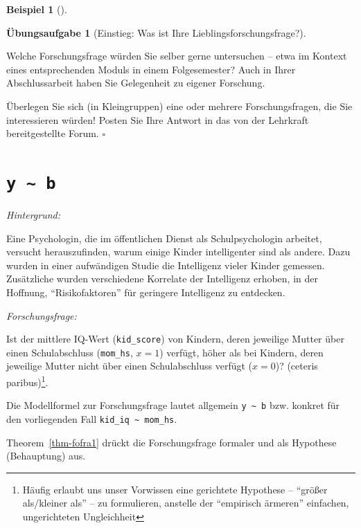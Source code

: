 \documentclass[
  ngerman,
  letterpaper,
  twoside,
  open=any]{scrbook}
\theoremstyle{definition}
\newtheorem{example}{Beispiel}[chapter]
\theoremstyle{plain}
\theoremstyle{definition}
\newtheorem{exercise}{Übungsaufgabe}[chapter]
\theoremstyle{definition}
\theoremstyle{remark}
\begin{document}
\begin{example}[]
\begin{exercise}[Einstieg: Was ist Ihre
Lieblingsforschungsfrage?]\protect\hypertarget{exr-einstieg}{}\label{exr-einstieg}

Welche Forschungsfrage würden Sie selber gerne untersuchen -- etwa im
Kontext eines entsprechenden Moduls in einem Folgesemester? Auch in
Ihrer Abschlussarbeit haben Sie Gelegenheit zu eigener Forschung.

Überlegen Sie sich (in Kleingruppen) eine oder mehrere Forschungsfragen,
die Sie interessieren würden! Posten Sie Ihre Antwort in das von der
Lehrkraft bereitgestellte Forum. \(\square\)

\end{exercise}

\section{\texorpdfstring{\texttt{y\ \textasciitilde{}\ b}}{y \textasciitilde{} b}}\label{y-b}

\emph{Hintergrund:}

Eine Psychologin, die im öffentlichen Dienst als Schulpsychologin
arbeitet, versucht herauszufinden, warum einige Kinder intelligenter
sind als andere. Dazu wurden in einer aufwändigen Studie die Intelligenz
vieler Kinder gemessen. Zusätzliche wurden verschiedene Korrelate der
Intelligenz erhoben, in der Hoffnung, \enquote{Risikofaktoren} für
geringere Intelligenz zu entdecken.

\emph{Forschungsfrage:}

\begin{displayquote}
Ist der mittlere IQ-Wert (\texttt{kid\_score}) von Kindern, deren
jeweilige Mutter über einen Schulabschluss (\texttt{mom\_hs}, \(x=1\))
verfügt, höher als bei Kindern, deren jeweilige Mutter nicht über einen
Schulabschluss verfügt (\(x=0\))? (ceteris paribus)\footnote{Häufig
  erlaubt uns unser Vorwissen eine gerichtete Hypothese --
  \enquote{größer als/kleiner als} -- zu formulieren, anstelle der
  \enquote{empirisch ärmeren} einfachen, ungerichteten Ungleichheit}.
\end{displayquote}

Die Modellformel zur Forschungsfrage lautet allgemein
\texttt{y\ \textasciitilde{}\ b} bzw. konkret für den vorliegenden Fall
\texttt{kid\_iq\ \textasciitilde{}\ mom\_hs}.

Theorem~\ref{thm-fofra1} drückt die Forschungsfrage formaler und als
Hypothese (Behauptung) aus.


\end{example}
\end{document}

